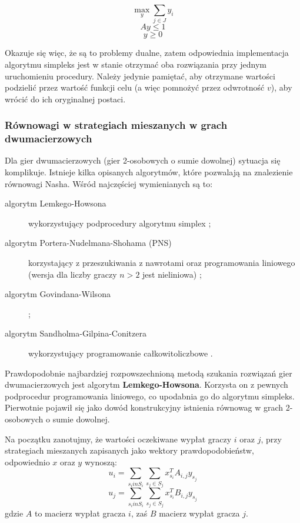 \documentclass[polish]{standalone}
\begin{document}
$$\max_y \sum_{j \in J} y_i$$
$$Ay \leq 1 $$
$$y \geq 0$$

Okazuje się więc, że są to problemy dualne, zatem odpowiednia implementacja algorytmu simpleks jest w stanie otrzymać
oba rozwiązania przy jednym uruchomieniu procedury. Należy jedynie pamiętać, aby otrzymane wartości podzielić przez
wartość funkcji celu (a więc pomnożyć przez odwrotność $v$), aby wrócić do ich oryginalnej postaci.

\subsubsection{Równowagi w strategiach mieszanych w grach dwumacierzowych}

Dla gier dwumacierzowych (gier 2-osobowych o sumie dowolnej) sytuacja się komplikuje. Istnieje kilka opisanych
algorytmów, które pozwalają na znalezienie równowagi Nasha. Wśród najczęściej wymienianych są to:
\begin{description}
\item[algorytm Lemkego-Howsona] wykorzystujący podprocedury algorytmu simplex \cite{LH-NE};
\item[algorytm Portera-Nudelmana-Shohama (PNS)] korzystający z przeszukiwania z nawrotami oraz programowania liniowego
(wersja dla liczby graczy $n > 2$ jest nieliniowa) \cite{PNS-NE};
\item[algorytm Govindana-Wilsona]  \cite{GR-NE};
\item[algorytm Sandholma-Gilpina-Conitzera] wykorzystujący programowanie całkowitoliczbowe \cite{SCG-NE}.
\end{description}

Prawdopodobnie najbardziej rozpowszechnioną metodą szukania rozwiązań gier dwumacierzowych jest algorytm
\textbf{Lemkego-Howsona}. Korzysta on z pewnych podprocedur programowania liniowego, co upodabnia go do algorytmu
simpleks. Pierwotnie pojawił się jako dowód konstrukcyjny istnienia równowag w grach 2-osobowych o sumie dowolnej.

Na początku zanotujmy, że wartości oczekiwane wypłat graczy $i$ oraz $j$, przy strategiach mieszanych zapisanych jako
wektory prawdopodobieństw, odpowiednio $x$ oraz $y$ wynoszą:
$$u_i = \sum_{s_i in S_i}\sum_{s_j \in S_j} x_{s_i}^{T} A_{i,j} y_{s_j}$$
$$u_j = \sum_{s_i in S_i}\sum_{s_j \in S_j} x_{s_i}^{T} B_{i,j} y_{s_j}$$
gdzie $A$ to macierz wypłat gracza $i$, zaś $B$ macierz wypłat gracza $j$.
\end{document}
